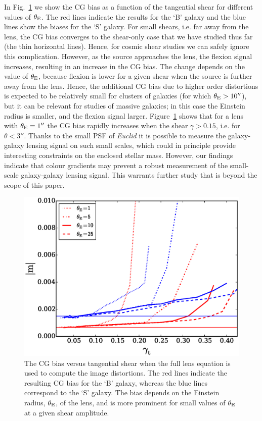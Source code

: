 \documentclass[useAMS,usenatbib]{mnras}
\begin{document}
In Fig.~\ref{fig:biasofgamma} we show the CG bias as a function of the tangential shear
for different values of $\theta_{\rm E}$. The red lines indicate the results for the `B' galaxy
and the blue lines show the biases for the `S' galaxy. For small shears, i.e. far away from the lens,
the CG bias converges to the shear-only case that we have studied thus far (the thin horizontal lines).
Hence, for cosmic shear studies we can safely ignore this complication. However, as the source approaches the lens, the flexion signal increases, resulting in an increase in the  CG bias. The change depends on the value of $\theta_{\rm E}$, because flexion is lower for a given shear when the source is further away from the lens. Hence, the additional CG bias due to higher order distortions is expected to be relatively small for clusters of galaxies (for which $\theta_{\rm E}>10''$), but it can be relevant for studies
of massive galaxies; in this case the Einstein radius is smaller, and the flexion signal larger. Figure~\ref{fig:biasofgamma} shows that for a lens with $\theta_{\rm E}=1''$ the CG bias rapidly increases when the shear $\gamma>0.15$, i.e. for $\theta<3''$. Thanks to the small PSF of {\it Euclid} it is possible to measure the galaxy-galaxy lensing signal on such small scales, which could in principle provide interesting constraints on the enclosed stellar mass. However, our findings indicate that colour gradients may prevent a robust measurement of the small-scale galaxy-galaxy lensing signal. This warrants further study that is beyond the scope of this paper.

%
\begin{figure}
  \centerline{\includegraphics[width=\hsize]{zcg_sis.eps}}
  \caption{The CG bias versus tangential shear when the full lens equation is used to compute the
  image distortions. The red lines indicate the resulting CG bias for the `B' galaxy, whereas the blue
  lines correspond to the `S' galaxy. The bias depends on the Einstein radius, $\theta_{\rm E}$, of the
  lens, and is more prominent for small values of  $\theta_{\rm E}$ at a given shear amplitude.}
  \label{fig:biasofgamma}
\end{figure}
%
\end{document}
